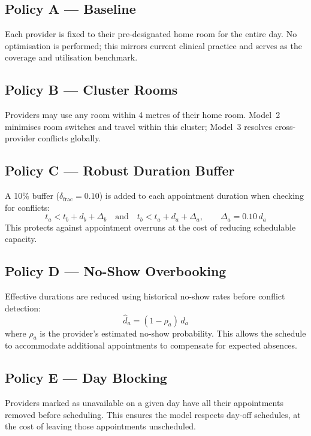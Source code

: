 \documentclass[12pt]{article}
\begin{document}
\subsection*{Policy A --- Baseline}

Each provider is fixed to their pre-designated home room for the entire day. No
optimisation is performed; this mirrors current clinical practice and serves as the
coverage and utilisation benchmark.

\subsection*{Policy B --- Cluster Rooms}

Providers may use any room within 4 metres of their home room. Model~2 minimises
room switches and travel within this cluster; Model~3 resolves cross-provider
conflicts globally.

\subsection*{Policy C --- Robust Duration Buffer}

A 10\% buffer ($\delta_{\mathrm{frac}} = 0.10$) is added to each appointment duration when
checking for conflicts:
\[
t_a < t_b + d_b + \Delta_b \quad \text{and} \quad t_b < t_a + d_a + \Delta_a, \qquad \Delta_a = 0.10\,d_a
\]
This protects against appointment overruns at the cost of reducing schedulable capacity.

\subsection*{Policy D --- No-Show Overbooking}

Effective durations are reduced using historical no-show rates before conflict detection:
\[
\hat{d}_a = (1 - \rho_a)\,d_a
\]
where $\rho_a$ is the provider's estimated no-show probability. This allows the schedule
to accommodate additional appointments to compensate for expected absences.

\subsection*{Policy E --- Day Blocking}

Providers marked as unavailable on a given day have all their appointments removed
before scheduling. This ensures the model respects day-off schedules, at the cost of
leaving those appointments unscheduled.
\end{document}
